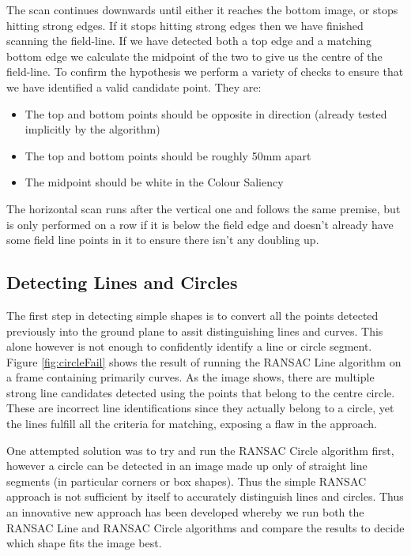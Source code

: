 \documentclass[runningheads,a4paper]{llncs}
\begin{document}
The scan continues downwards until either it reaches the bottom image, or stops hitting strong edges. If it stops hitting strong edges then we have finished scanning the field-line. If we have detected both a top edge and a matching bottom edge we calculate the midpoint of the two to give us the centre of the field-line. To confirm the hypothesis we perform a variety of checks to ensure that we have identified a valid candidate point. They are:

\begin{itemize}
\item The top and bottom points should be opposite in direction (already tested implicitly by the algorithm)
\item	The top and bottom points should be roughly 50mm apart
\item	The midpoint should be white in the Colour Saliency
\end{itemize}

The horizontal scan runs after the vertical one and follows the same premise, but is only performed on a row if it is below the field edge and doesn't already have some field line points in it to ensure there isn't any doubling up.

\subsection{Detecting Lines and Circles}
The first step in detecting simple shapes is to convert all the points detected previously into the ground plane to assit distinguishing lines and curves. This alone however is not enough to confidently identify a line or circle segment. Figure \ref{fig:circleFail} shows the result of running the RANSAC Line\cite{RANSAC} algorithm on a frame containing primarily curves. As the image shows, there are multiple strong line candidates detected using the points that belong to the centre circle. These are incorrect line identifications since they actually belong to a circle, yet the lines fulfill all the criteria for matching, exposing a flaw in the approach.

One attempted solution was to try and run the RANSAC Circle\cite{RANSAC} algorithm first, however a circle can be detected in an image made up only of straight line segments (in particular corners or box shapes). Thus the simple RANSAC approach is not sufficient by itself to accurately distinguish lines and circles. Thus an innovative new approach has been developed whereby we run both the RANSAC Line and RANSAC Circle algorithms and compare the results to decide which shape fits the image best.
\end{document}
